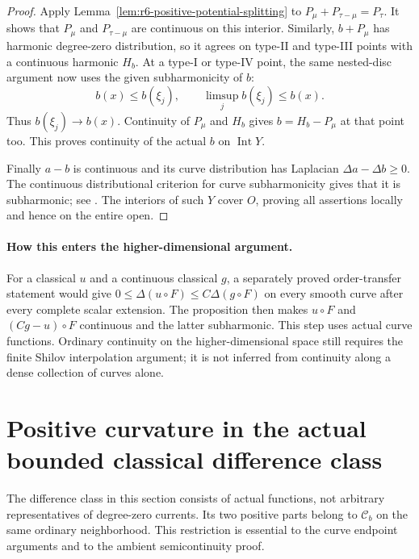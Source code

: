 \documentclass[11pt,a4paper]{article}
\numberwithin{equation}{section}
\theoremstyle{definition}
\theoremstyle{remark}
\begin{document}
\begin{proof}
Apply Lemma~\ref{lem:r6-positive-potential-splitting} to
$P_\mu+P_{\tau-\mu}=P_\tau$. It shows that $P_\mu$ and
$P_{\tau-\mu}$ are continuous on this interior. Similarly,
$b+P_\mu$ has harmonic degree-zero distribution, so it agrees
on type-II and type-III points with a continuous harmonic $H_b$.
At a type-I or type-IV point, the same nested-disc argument now
uses the given subharmonicity of $b$:
\[
                  b(x)\le b(\xi_j),\qquad
                  \limsup_j b(\xi_j)\le b(x).
\]
Thus $b(\xi_j)\to b(x)$. Continuity of $P_\mu$ and $H_b$
gives $b=H_b-P_\mu$ at that point too. This proves continuity
of the actual $b$ on $\operatorname{Int}Y$.

Finally $a-b$ is continuous and its curve distribution has
Laplacian $\Delta a-\Delta b\ge0$. The continuous distributional
criterion for curve subharmonicity gives that it is subharmonic;
see \cite[Definition 3.11 and Remark 3.12]{Wan22}. The interiors
of such $Y$ cover $O$, proving all assertions locally and hence
on the entire open.
\end{proof}

\paragraph{How this enters the higher-dimensional argument.}
For a classical $u$ and a continuous classical $g$, a separately
proved order-transfer statement would give
$0\le\Delta(u\circ F)\le C\Delta(g\circ F)$ on every smooth
curve after every complete scalar extension. The proposition then
makes $u\circ F$ and $(Cg-u)\circ F$ continuous and the latter
subharmonic. This step uses actual curve functions. Ordinary
continuity on the higher-dimensional space still requires the
finite Shilov interpolation argument; it is not inferred from
continuity along a dense collection of curves alone.



\section{Positive curvature in the actual bounded classical difference class}
\label{sec:r6-positive-dsh-representatives}

The difference class in this section consists of actual functions,
not arbitrary representatives of degree-zero currents. Its two positive
parts belong to $\mathcal C_b$ on the same ordinary neighborhood.
This restriction is essential to the curve endpoint arguments and to
the ambient semicontinuity proof.
\end{document}

